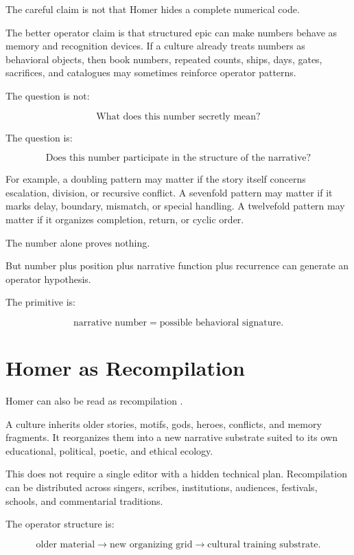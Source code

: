 \documentclass[11pt]{book}
\begin{document}
The careful claim is not that Homer hides a complete numerical code.

The better operator claim is that structured epic can make numbers behave as memory and recognition devices. If a culture already treats numbers as behavioral objects, then book numbers, repeated counts, ships, days, gates, sacrifices, and catalogues may sometimes reinforce operator patterns.

The question is not:

\[
\text{What does this number secretly mean?}
\]

The question is:

\[
\text{Does this number participate in the structure of the narrative?}
\]

For example, a doubling pattern may matter if the story itself concerns escalation, division, or recursive conflict. A sevenfold pattern may matter if it marks delay, boundary, mismatch, or special handling. A twelvefold pattern may matter if it organizes completion, return, or cyclic order.

The number alone proves nothing.

But number plus position plus narrative function plus recurrence can generate an operator hypothesis.

The primitive is:

\[
\text{narrative number} = \text{possible behavioral signature}.
\]

\section{Homer as Recompilation}

Homer can also be read as recompilation \cite{Nagy1979BestAchaeans,Parry1971MakingHomericVerse,Lord1960SingerOfTales}.

A culture inherits older stories, motifs, gods, heroes, conflicts, and memory fragments. It reorganizes them into a new narrative substrate suited to its own educational, political, poetic, and ethical ecology.

This does not require a single editor with a hidden technical plan. Recompilation can be distributed across singers, scribes, institutions, audiences, festivals, schools, and commentarial traditions.

The operator structure is:

\[
\text{older material}
\rightarrow
\text{new organizing grid}
\rightarrow
\text{cultural training substrate}.
\]
\end{document}
